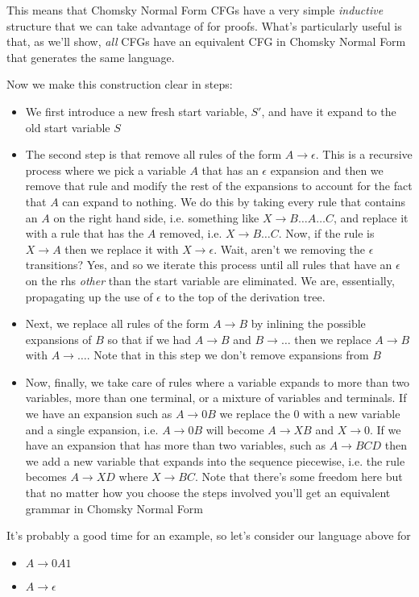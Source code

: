 \documentclass[11pt]{article}
\begin{document}
This means that Chomsky Normal Form CFGs have a very simple \emph{inductive} structure that we can take advantage of for proofs. What's particularly useful is that, as we'll show, \emph{all} CFGs have an equivalent CFG in Chomsky Normal Form that generates the same language.

Now we make this construction clear in steps:
\begin{itemize}
\item We first introduce a new fresh start variable, $S'$, and have it expand to the old start variable $S$
\item The second step is that remove all rules of the form $A \to \epsilon$. This is a recursive process where we pick a variable $A$ that has an $\epsilon$ expansion and then we remove that rule and modify the rest of the expansions to account for the fact that $A$ can expand to nothing. We do this by taking every rule that contains an $A$ on the right hand side, i.e. something like $X \to B \ldots A \ldots C$, and replace it with a rule that has the $A$ removed, i.e. $X \to B \ldots C$. Now, if the rule is $X \to A$ then we replace it with $X \to \epsilon$. Wait, aren't we removing the $\epsilon$ transitions? Yes, and so we iterate this process until all rules that have an $\epsilon$ on the rhs \emph{other} than the start variable are eliminated. We are, essentially, propagating up the use of $\epsilon$ to the top of the derivation tree.
\item Next, we replace all rules of the form $A \to B$ by inlining the possible expansions of $B$ so that if we had $A \to B$ and $B \to \ldots$ then we replace $A \to B$ with $A \to \ldots$. Note that in this step we don't remove expansions from $B$
\item Now, finally, we take care of rules where a variable expands to more than two variables, more than one terminal, or a mixture of variables and terminals. If we have an expansion such as $A \to 0B$ we replace the 0 with a new variable and a single expansion, i.e. $A \to 0B$ will become $A \to XB$ and $X \to 0$. If we have an expansion that has more than two variables, such as $A \to B C D$ then we add a new variable that expands into the sequence piecewise, i.e. the rule becomes $A \to X D$ where $X \to B C$. Note that there's some freedom here but that no matter how you choose the steps involved you'll get an equivalent grammar in Chomsky Normal Form
\end{itemize}

It's probably a good time for an example, so let's consider our language above for 
\begin{itemize}
\item $A \to 0A1$
\item $A \to \epsilon$
\end{itemize}
\end{document}
